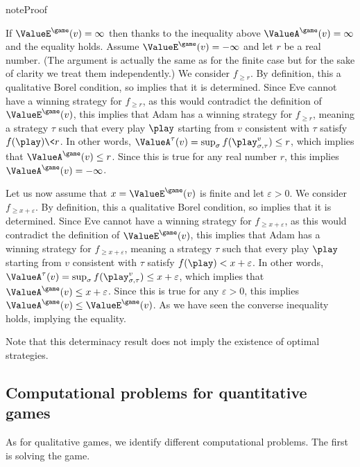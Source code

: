 \documentclass[letterpaper,10pt,english]{sphinxmanual}
\begin{document}
\begin{sphinxadmonition}{note}{Proof}

If \(\ValueE^{\game}(v) = \infty\) then thanks to the inequality
above \(\ValueA^{\game}(v) = \infty\) and the equality holds. Assume
\(\ValueE^{\game}(v) = -\infty\) and let \(r\) be a real number. (The
argument is actually the same as for the finite case but for the sake of
clarity we treat them independently.) We consider \(f_{\ge r}\). By
definition, this a qualitative Borel condition, so implies that it is
determined. Since Eve cannot have a winning strategy for \(f_{\ge r}\), as
this would contradict the definition of \(\ValueE^{\game}(v)\), this
implies that Adam has a winning strategy for \(f_{\ge r}\), meaning a
strategy \(\tau\) such that every play \(\play\) starting from \(v\)
consistent with \(\tau\) satisfy \(f(\play) \< r\).
In other words, \(\ValueA^{\tau}(v) = \sup_{\sigma} f(\play_{\sigma,\tau}^{v}) \le r\),
which implies that \(\ValueA^{\game}(v) \le r\). Since this is true for
any real number \(r\), this implies \(\ValueA^{\game}(v) = -\infty\).

Let us now assume that \(x = \ValueE^{\game}(v)\) is finite and let
\(\varepsilon > 0\). We consider \(f_{\ge x + \varepsilon}\). By definition,
this a qualitative Borel condition, so implies that it is determined.
Since Eve cannot have a winning strategy for \(f_{\ge x + \varepsilon}\),
as this would contradict the definition of \(\ValueE^{\game}(v)\), this
implies that Adam has a winning strategy for \(f_{\ge x + \varepsilon}\),
meaning a strategy \(\tau\) such that every play \(\play\) starting from \(v\)
consistent with \(\tau\) satisfy \(f(\play) < x + \varepsilon\). In other
words,
\(\ValueA^{\tau}(v) = \sup_{\sigma} f(\play_{\sigma,\tau}^{v}) \le x + \varepsilon\),
which implies that \(\ValueA^{\game}(v) \le x + \varepsilon\). Since this
is true for any \(\varepsilon > 0\), this implies
\(\ValueA^{\game}(v) \le \ValueE^{\game}(v)\). As we have seen the
converse inequality holds, implying the equality.
\end{sphinxadmonition}

Note that this determinacy result does not imply the existence of
optimal strategies.


\subsection{Computational problems for quantitative games}
\label{\detokenize{1_Introduction/simple:computational-problems-for-quantitative-games}}\label{\detokenize{1_Introduction/simple:subsec-computational-problems-for-quantitative-games}}
As for qualitative games, we identify different computational problems.
The first is solving the game.
\end{document}
